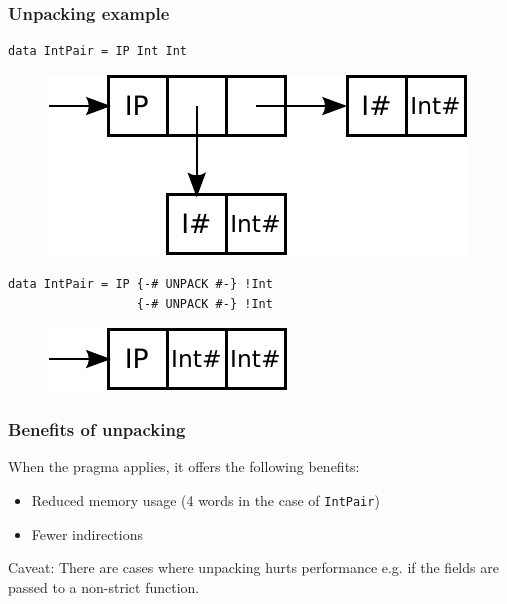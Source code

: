 \documentclass{beamer}
\begin{document}
\begin{frame}[fragile]
  \frametitle{Unpacking example}

  \begin{lstlisting}
data IntPair = IP Int Int
  \end{lstlisting}

  \begin{figure}
    \includegraphics[scale=0.75]{diagrams/intpair.pdf}
  \end{figure}

  \begin{lstlisting}
data IntPair = IP {-# UNPACK #-} !Int
                  {-# UNPACK #-} !Int
  \end{lstlisting}

  \begin{figure}
    \includegraphics[scale=0.75]{diagrams/intpair-unpacked.pdf}
  \end{figure}
\end{frame}

\begin{frame}[fragile]
  \frametitle{Benefits of unpacking}

  When the pragma applies, it offers the following benefits:
  \begin{itemize}
  \item Reduced memory usage (4 words in the case of
    \lstinline!IntPair!)
  \item Fewer indirections
  \end{itemize}

  Caveat: There are cases where unpacking hurts performance e.g. if
  the fields are passed to a non-strict function.
\end{frame}


\end{document}
